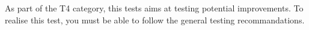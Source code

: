 \begin{itshape}
As part of the T4 category, this tests aims at testing potential improvements.
To realise this test, you must be able to follow the general testing recommandations. 
\end{itshape}
\newline

